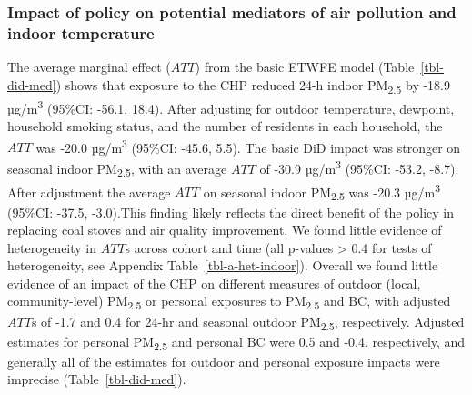 \documentclass[
  letterpaper,
  DIV=11,
  numbers=noendperiod]{scrartcl}
\begin{document}
\subsubsection{Impact of policy on potential mediators of air pollution
and indoor
temperature}\label{impact-of-policy-on-potential-mediators-of-air-pollution-and-indoor-temperature}

The average marginal effect (\(ATT\)) from the basic ETWFE model
(Table~\ref{tbl-did-med}) shows that exposure to the CHP reduced 24-h
indoor PM\textsubscript{2.5} by -18.9 µg/m\textsuperscript{3} (95\%CI:
-56.1, 18.4). After adjusting for outdoor temperature, dewpoint,
household smoking status, and the number of residents in each household,
the \(ATT\) was -20.0 µg/m\textsuperscript{3} (95\%CI: -45.6, 5.5). The
basic DiD impact was stronger on seasonal indoor PM\textsubscript{2.5},
with an average \(ATT\) of -30.9 µg/m\textsuperscript{3} (95\%CI: -53.2,
-8.7). After adjustment the average \(ATT\) on seasonal indoor
PM\textsubscript{2.5} was -20.3 µg/m\textsuperscript{3} (95\%CI: -37.5,
-3.0).This finding likely reflects the direct benefit of the policy in
replacing coal stoves and air quality improvement. We found
 little evidence of heterogeneity in \(ATT\)s across
cohort and time (all p-values \textgreater{} 0.4 for tests of
heterogeneity, see Appendix Table~\ref{tbl-a-het-indoor}). Overall we
found little evidence of an impact of the CHP on different measures of
outdoor (local, community-level) PM\textsubscript{2.5} or personal
exposures to PM\textsubscript{2.5} and BC, with adjusted \(ATT\)s of
-1.7 and 0.4 for 24-hr and seasonal outdoor PM\textsubscript{2.5},
respectively. Adjusted estimates for personal PM\textsubscript{2.5} and
personal BC were 0.5 and -0.4, respectively, and generally all of the
estimates for outdoor and personal exposure impacts were imprecise
(Table~\ref{tbl-did-med}).
\end{document}
